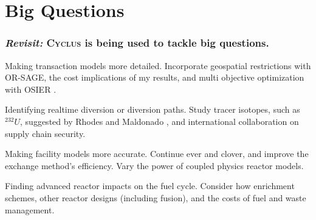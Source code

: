 \documentclass[9pt]{beamer}
\newcommand{\cyclus}{\textsc{Cyclus}\xspace}
\begin{document}

  \section{Big Questions}
  \begin{frame}
    \frametitle{\textit{Revisit:} \cyclus is being used to tackle big questions.}
    \begin{block}{Making transaction models more detailed.}
        Incorporate geospatial restrictions with OR-SAGE, the cost implications of my results, and multi objective optimization with OSIER \cite{Dotson_osier}.
    \end{block}
    \begin{block}{Identifying realtime diversion or diversion paths.}
        Study tracer isotopes, such as $^{232}U$, suggested by Rhodes and Maldonado \cite{rhodes_u232}, and international collaboration on supply chain security.
    \end{block}
    \begin{block}{Making facility models more accurate.}
      Continue \gls{ever} and \gls{clover}, and improve the exchange method's efficiency. Vary the power of coupled physics reactor models.
    \end{block}
    \begin{block}{Finding advanced reactor impacts on the fuel cycle.}
      Consider how enrichment schemes, other reactor designs (including fusion), and the costs of fuel and waste management.
    \end{block}
  \end{frame}
\end{document}
